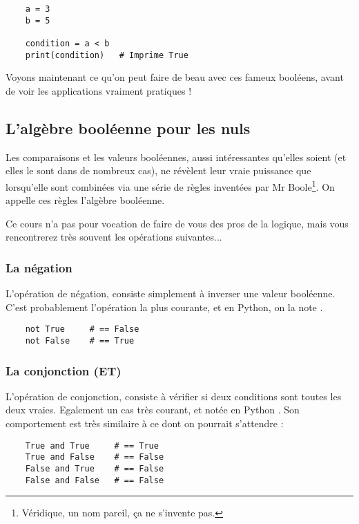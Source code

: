 \begin{lstlisting}
    a = 3
    b = 5

    condition = a < b
    print(condition)   # Imprime True
\end{lstlisting}

Voyons maintenant ce qu'on peut faire de beau avec ces fameux booléens, avant de voir les applications vraiment pratiques !

\subsection{L'algèbre booléenne pour les nuls}

Les comparaisons et les valeurs booléennes, aussi intéressantes qu'elles soient (et elles le sont dans de nombreux cas), ne révèlent leur vraie puissance que lorsqu'elle sont combinées via une série de règles inventées par Mr Boole\footnote{Véridique, un nom pareil, ça ne s'invente pas.}. On appelle ces règles l'algèbre booléenne.

Ce cours n'a pas pour vocation de faire de vous des pros de la logique, mais vous rencontrerez très souvent les opérations suivantes...

\subsubsection{La négation}

L'opération de négation, consiste simplement à inverser une valeur booléenne. C'est probablement l'opération la plus courante, et en Python, on la note .

\begin{lstlisting}
    not True     # == False
    not False    # == True
\end{lstlisting}

\subsubsection{La conjonction (ET)}

L'opération de conjonction, consiste à vérifier si deux conditions sont toutes les deux vraies. Egalement un cas très courant, et notée en Python . Son comportement est très similaire à ce dont on pourrait s'attendre :

\begin{lstlisting}
    True and True     # == True
    True and False    # == False
    False and True    # == False
    False and False   # == False
\end{lstlisting}

